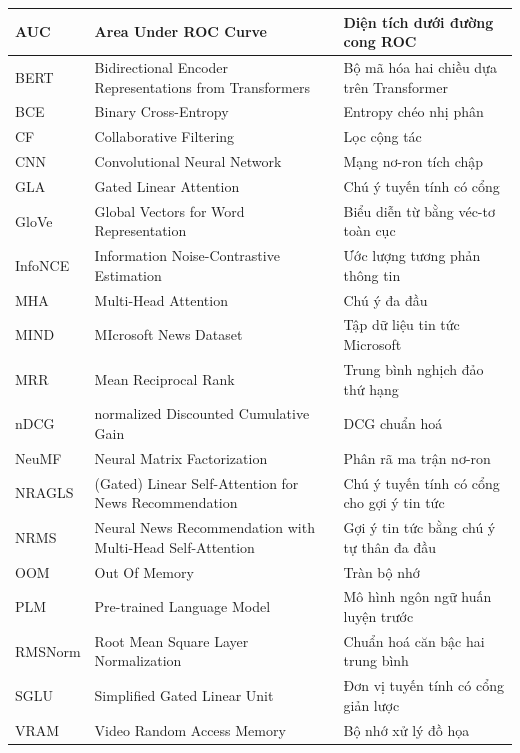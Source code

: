\documentclass[../BTL.tex]{subfiles}
\begin{document}
\begin{longtable}{|l|p{6cm}|p{7cm}|}
	AUC & Area Under ROC Curve & Diện tích dưới đường cong ROC \\
	\hline
	BERT & Bidirectional Encoder Representations from Transformers & Bộ mã hóa hai chiều dựa trên Transformer \\
	\hline
	BCE & Binary Cross-Entropy & Entropy chéo nhị phân \\
	\hline
	CF & Collaborative Filtering & Lọc cộng tác \\
	\hline
	CNN & Convolutional Neural Network & Mạng nơ-ron tích chập \\
	\hline
	GLA & Gated Linear Attention & Chú ý tuyến tính có cổng \\
	\hline
	GloVe & Global Vectors for Word Representation & Biểu diễn từ bằng véc-tơ toàn cục \\
	\hline
	InfoNCE & Information Noise-Contrastive Estimation & Ước lượng tương phản thông tin \\
	\hline
	MHA & Multi-Head Attention & Chú ý đa đầu \\
	\hline
	MIND & MIcrosoft News Dataset & Tập dữ liệu tin tức Microsoft \\
	\hline
	MRR & Mean Reciprocal Rank & Trung bình nghịch đảo thứ hạng \\
	\hline
	nDCG & normalized Discounted Cumulative Gain & DCG chuẩn hoá \\
	\hline
	NeuMF & Neural Matrix Factorization & Phân rã ma trận nơ-ron \\
	\hline
	NRAGLS & (Gated) Linear Self-Attention for News Recommendation & Chú ý tuyến tính có cổng cho gợi ý tin tức \\
	\hline
	NRMS & Neural News Recommendation with Multi-Head Self-Attention & Gợi ý tin tức bằng chú ý tự thân đa đầu \\
	\hline
	OOM & Out Of Memory & Tràn bộ nhớ \\
	\hline
	PLM & Pre-trained Language Model & Mô hình ngôn ngữ huấn luyện trước \\
	\hline
	RMSNorm & Root Mean Square Layer Normalization & Chuẩn hoá căn bậc hai trung bình \\
	\hline
	SGLU & Simplified Gated Linear Unit & Đơn vị tuyến tính có cổng giản lược \\
	\hline
	VRAM & Video Random Access Memory & Bộ nhớ xử lý đồ họa \\
	\hline

\end{longtable}
\end{document}
